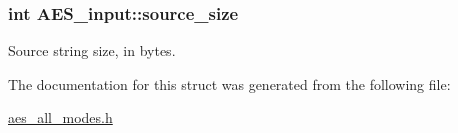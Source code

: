 \hypertarget{struct_a_e_s__input_a37fb0a3598c9ac44d977642bc51ab0e9}{
\subsubsection[{source\+\_\+size}]{\setlength{\rightskip}{0pt plus 5cm}int A\+E\+S\+\_\+input\+::source\+\_\+size}}\label{struct_a_e_s__input_a37fb0a3598c9ac44d977642bc51ab0e9}


Source string size, in bytes. 



The documentation for this struct was generated from the following file\+:\begin{DoxyCompactItemize}
\item 
\hyperlink{aes__all__modes_8h}{aes\+\_\+all\+\_\+modes.\+h}\end{DoxyCompactItemize}
